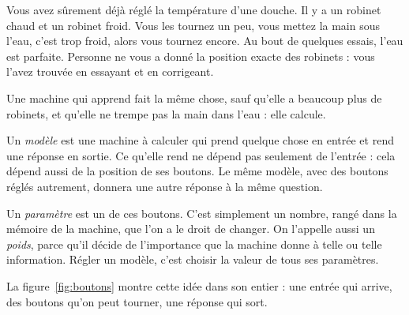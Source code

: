Vous avez sûrement déjà réglé la température d'une douche. Il y a un
robinet chaud et un robinet froid. Vous les tournez un peu, vous mettez la
main sous l'eau, c'est trop froid, alors vous tournez encore. Au bout de
quelques essais, l'eau est parfaite. Personne ne vous a donné la position
exacte des robinets : vous l'avez trouvée en essayant et en corrigeant.

Une machine qui apprend fait la même chose, sauf qu'elle a beaucoup plus de
robinets, et qu'elle ne trempe pas la main dans l'eau : elle calcule.

\begin{definition}[Le modèle][modele]
Un \emph{modèle} est une machine à calculer qui prend quelque chose en
entrée et rend une réponse en sortie. Ce qu'elle rend ne dépend pas
seulement de l'entrée : cela dépend aussi de la position de ses boutons. Le
même modèle, avec des boutons réglés autrement, donnera une autre réponse à
la même question.
\end{definition}

\begin{definition}
Un \emph{paramètre} est un de ces boutons. C'est simplement un nombre, rangé
dans la mémoire de la machine, que l'on a le droit de changer. On l'appelle
aussi un \emph{poids}, parce qu'il décide de l'importance que la machine
donne à telle ou telle information. Régler un modèle, c'est choisir la
valeur de tous ses paramètres.
\end{definition}

La figure~\ref{fig:boutons} montre cette idée dans son entier : une entrée
qui arrive, des boutons qu'on peut tourner, une réponse qui sort.

